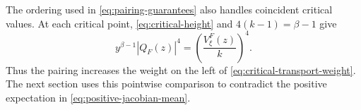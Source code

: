 The ordering used in \eqref{eq:pairing-guarantees} also handles coincident critical values.
At each critical point, \eqref{eq:critical-height} and
$4(k-1)=\beta-1$ give
\begin{equation}
 y^{\beta-1}|Q_F(z)|^4
   =\left(\frac{V^F_\xi(z)}k\right)^4.
 \label{eq:critical-transport-weight}
\end{equation}
Thus the pairing increases the weight on the left of
\eqref{eq:critical-transport-weight}.  The next section uses this
pointwise comparison to contradict the positive expectation in
\eqref{eq:positive-jacobian-mean}.
